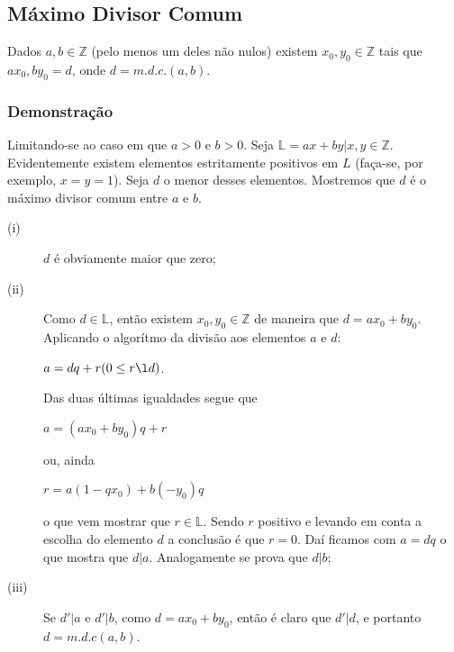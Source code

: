 \subsection*{Máximo Divisor Comum}
Dados $a, b \in \mathbb{Z}$ (pelo menos um deles não nulos) existem $x_0, y_0 \in \mathbb{Z}$
tais que $ax_0, by_0 = d$, onde $d = m.d.c.(a, b)$.

\subsubsection*{Demonstração}
Limitando-se ao caso em que $a > 0$ e $b > 0$.
Seja $\mathbb{L} = {ax + by | x, y \in \mathbb{Z}}$.
Evidentemente existem elementos estritamente positivos em $L$ (faça-se, por exemplo, $x = y = 1$).
Seja $d$ o menor desses elementos.
Mostremos que $d$ é o máximo divisor comum entre $a$ e $b$.
\begin{description}
    \item[(i)] $d$ é obviamente maior que zero; \newline
    \item[(ii)] Como $d \in \mathbb{L}$, então existem $x_0, y_0 \in \mathbb{Z}$ de maneira que $d = ax_0 + by_0$.
    Aplicando o algorítmo da divisão aos elementos $a$ e $d$:

$a = dq + r (0 \leq r \l d)$.

Das duas últimas igualdades segue que

$a = (ax_0 + by_0)q + r$

ou, ainda

$r = a(1 - qx_0) + b(-y_0)q$

o que vem mostrar que $r \in \mathbb{L}$. Sendo $r$ positivo e levando em conta a escolha do
elemento $d$ a conclusão é que $r = 0$. Daí ficamos com $a = dq$ o que mostra que $d|a$.
Analogamente se prova que $d|b$;
    \item [(iii)] Se $d'|a$ e $d'|b$, como $d = ax_0 + by_0$, então é claro que $d'|d$, e portanto $d = m.d.c(a, b)$.
\end{description}